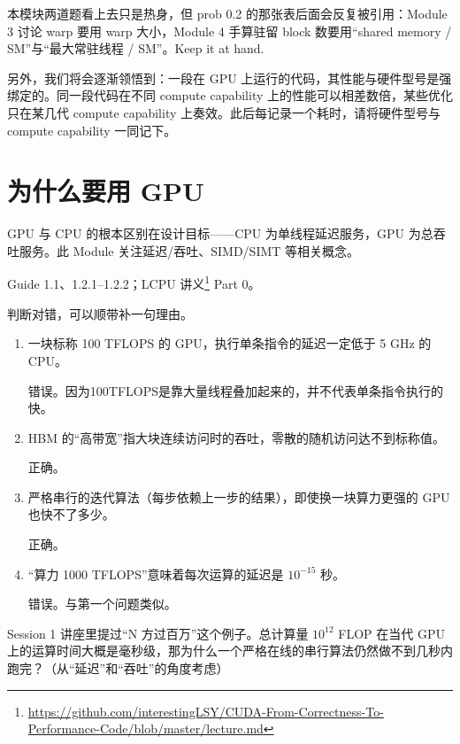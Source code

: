 \documentclass[11pt,a4paper,fontset=none]{ctexart}
\begin{document}
\begin{lookback}
本模块两道题看上去只是热身，但 prob 0.2 的那张表后面会反复被引用：Module 3 讨论 warp 要用 warp 大小，Module 4 手算驻留 block 数要用“shared memory / SM”与“最大常驻线程 / SM”。Keep it at hand.

另外，我们将会逐渐领悟到：一段在 GPU 上运行的代码，其性能与硬件型号是强绑定的。同一段代码在不同 compute capability 上的性能可以相差数倍，某些优化只在某几代 compute capability 上奏效。此后每记录一个耗时，请将硬件型号与 compute capability 一同记下。
\end{lookback}

\section{为什么要用 GPU}

GPU 与 CPU 的根本区别在设计目标——CPU 为单线程延迟服务，GPU 为总吞吐服务。此 Module 关注延迟/吞吐、SIMD/SIMT 等相关概念。

\begin{reading}
Guide 1.1、1.2.1--1.2.2；LCPU 讲义\footnote{\url{https://github.com/interestingLSY/CUDA-From-Correctness-To-Performance-Code/blob/master/lecture.md}} Part 0。
\end{reading}

判断对错，可以顺带补一句理由。
\begin{enumerate}[label=(\alph*)]
  \item 一块标称 100 TFLOPS 的 GPU，执行单条指令的延迟一定低于 5 GHz 的 CPU。

  错误。因为100TFLOPS是靠大量线程叠加起来的，并不代表单条指令执行的快。

  \item HBM 的“高带宽”指大块连续访问时的吞吐，零散的随机访问达不到标称值。

  正确。

  \item 严格串行的迭代算法（每步依赖上一步的结果），即使换一块算力更强的 GPU 也快不了多少。

  正确。

  \item “算力 1000 TFLOPS”意味着每次运算的延迟是 $10^{-15}$ 秒。

  错误。与第一个问题类似。

\end{enumerate}

Session 1 讲座里提过“N 方过百万”这个例子。总计算量 $10^{12}$ FLOP 在当代 GPU 上的运算时间大概是毫秒级，那为什么一个严格在线的串行算法仍然做不到几秒内跑完？（从“延迟”和“吞吐”的角度考虑）
\end{document}
